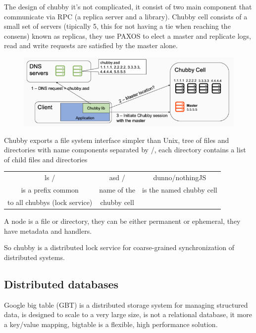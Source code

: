 The design of chubby it's not complicated, it consist of two main component that communicate via RPC (a replica server and a library). Chubby cell consists of a small set of servers (tipically 5, this for not having a tie when reaching the consens) known as replicas, they use PAXOS to elect a master and replicate logs, read and write requests are satisfied by the master alone.
\begin{figure}[h!]
    \centering
    \includegraphics[scale=0.35]{images/chubbydesign.png}
\end{figure}

Chubby exports a file system interface simpler than Unix, tree of files and directories with name components separated by /, each directory contains a list of child files and directories 

\begin{table}[h!]
    \centering
    \begin{tabular}{c c c}
          ls / & asd / & dunno/nothingJS\\
          is a prefix common & name of the & is the named chubby cell\\
          to all chubbys (lock service) & chubby cell 
    \end{tabular}
\end{table}

A node is a file or directory, they can be either permanent or ephemeral, they have metadata and handlers.

So chubby is a distributed lock service for coarse-grained synchronization of distributed systems.

\subsection{Distributed databases}
Google big table (GBT) is a distributed storage system for managing structured data, is designed to scale to a very large size, is not a relational database, it more a key/value mapping, bigtable is a flexible, high performance solution.

